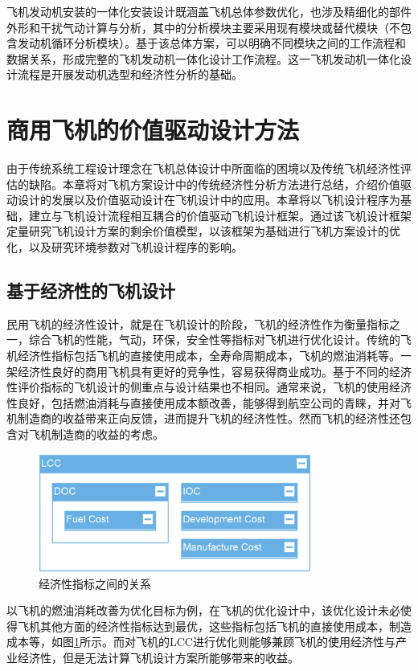 \documentclass[12pt,a4paper]{report}
\begin{document}
飞机发动机安装的一体化安装设计既涵盖飞机总体参数优化，也涉及精细化的部件外形和干扰气动计算与分析，其中的分析模块主要采用现有模块或替代模块（不包含发动机循环分析模块）。基于该总体方案，可以明确不同模块之间的工作流程和数据关系，形成完整的飞机发动机一体化设计工作流程。这一飞机发动机一体化设计流程是开展发动机选型和经济性分析的基础。

\section{商用飞机的价值驱动设计方法}

由于传统系统工程设计理念在飞机总体设计中所面临的困境以及传统飞机经济性评估的缺陷。本章将对飞机方案设计中的传统经济性分析方法进行总结，介绍价值驱动设计的发展以及价值驱动设计在飞机设计中的应用。本章将以飞机设计程序为基础，建立与飞机设计流程相互耦合的价值驱动飞机设计框架。通过该飞机设计框架定量研究飞机设计方案的剩余价值模型，以该框架为基础进行飞机方案设计的优化，以及研究环境参数对飞机设计程序的影响。

\subsection{基于经济性的飞机设计}
民用飞机的经济性设计，就是在飞机设计的阶段，飞机的经济性作为衡量指标之一，综合飞机的性能，气动，环保，安全性等指标对飞机进行优化设计。传统的飞机经济性指标包括飞机的直接使用成本，全寿命周期成本，飞机的燃油消耗等。一架经济性良好的商用飞机具有更好的竞争性，容易获得商业成功。基于不同的经济性评价指标的飞机设计的侧重点与设计结果也不相同。通常来说，飞机的使用经济性良好，包括燃油消耗与直接使用成本额改善，能够得到航空公司的青睐，并对飞机制造商的收益带来正向反馈，进而提升飞机的经济性性。然而飞机的经济性还包含对飞机制造商的收益的考虑。

\begin{figure}[H]
	\centering
	\includegraphics[width=0.8\textwidth]{./media3/image1.png}
	\caption{经济性指标之间的关系}
	\label{fig:ecofactors}
\end{figure}

以飞机的燃油消耗改善为优化目标为例，在飞机的优化设计中，该优化设计未必使得飞机其他方面的经济性指标达到最优，这些指标包括飞机的直接使用成本，制造成本等，如图\ref{fig:ecofactors}所示。而对飞机的LCC进行优化则能够兼顾飞机的使用经济性与产业经济性，但是无法计算飞机设计方案所能够带来的收益。
\end{document}
